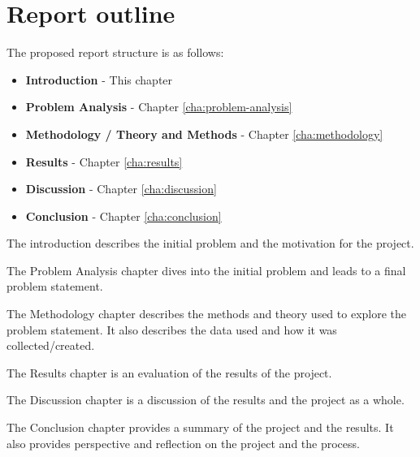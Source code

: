 \section{Report outline}\label{sec:report-outline}
The proposed report structure is as follows:

\begin{itemize}
    \item \textbf{Introduction} - This chapter
    \item \textbf{Problem Analysis} - Chapter \ref{cha:problem-analysis}
    \item \textbf{Methodology / Theory and Methods} - Chapter \ref{cha:methodology}
    \item \textbf{Results} - Chapter \ref{cha:results}
    \item \textbf{Discussion} - Chapter \ref{cha:discussion}
    \item \textbf{Conclusion} - Chapter \ref{cha:conclusion}
\end{itemize}

The introduction describes the initial problem and the motivation for the project.

The Problem Analysis chapter dives into the initial problem and leads to a final problem statement.

The Methodology chapter describes the methods and theory used to explore the problem statement. It also describes the data used and how it was collected/created.

The Results chapter is an evaluation of the results of the project.

The Discussion chapter is a discussion of the results and the project as a whole.

The Conclusion chapter provides a summary of the project and the results. It also provides perspective and reflection on the project and the process.